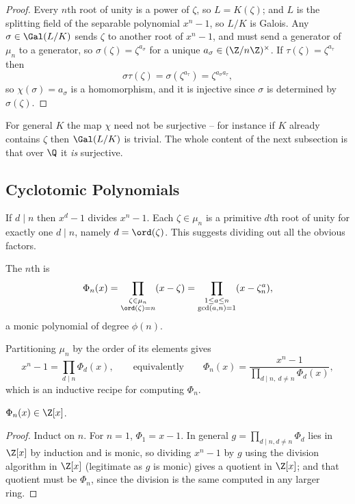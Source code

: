 \begin{proof}
	Every $n$th root of unity is a power of $\zeta$, so $L = K(\zeta)$; and $L$ is the splitting field of the separable polynomial $x^n-1$, so $L/K$ is Galois. Any $\sigma \in \Gal(L/K)$ sends $\zeta$ to another root of $x^n-1$, and must send a generator of $\mu_n$ to a generator, so $\sigma(\zeta) = \zeta^{a_\sigma}$ for a unique $a_\sigma \in (\Z/n\Z)^\times$. If $\tau(\zeta) = \zeta^{a_\tau}$ then
	$$\sigma\tau(\zeta) = \sigma(\zeta^{a_\tau}) = \zeta^{a_\sigma a_\tau},$$
	so $\chi(\sigma) = a_\sigma$ is a homomorphism, and it is injective since $\sigma$ is determined by $\sigma(\zeta)$.
\end{proof}

For general $K$ the map $\chi$ need not be surjective -- for instance if $K$ already contains $\zeta$ then $\Gal(L/K)$ is trivial. The whole content of the next subsection is that over $\Q$ it \emph{is} surjective.

\subsection{Cyclotomic Polynomials}

If $d \mid n$ then $x^d - 1$ divides $x^n-1$. Each $\zeta \in \mu_n$ is a primitive $d$th root of unity for exactly one $d \mid n$, namely $d = \ord(\zeta)$. This suggests dividing out all the obvious factors.

\begin{definition}
	The $n$th  is
	$$\Phi_n(x) = \prod_{\substack{\zeta \in \mu_n \\ \ord(\zeta) = n}} (x - \zeta) = \prod_{\substack{1 \leq a \leq n\\ \gcd(a,n)=1}}(x - \zeta_n^a),$$
	a monic polynomial of degree $\phi(n)$.
\end{definition}

Partitioning $\mu_n$ by the order of its elements gives
$$x^n - 1 = \prod_{d \mid n}\Phi_d(x), \qquad\text{equivalently}\qquad \Phi_n(x) = \frac{x^n-1}{\prod_{d\mid n,\ d\neq n}\Phi_d(x)},$$
which is an inductive recipe for computing $\Phi_n$.

\begin{proposition}
	$\Phi_n(x) \in \Z[x]$.
\end{proposition}

\begin{proof}
	Induct on $n$. For $n=1$, $\Phi_1 = x-1$. In general $g = \prod_{d\mid n, d\neq n}\Phi_d$ lies in $\Z[x]$ by induction and is monic, so dividing $x^n-1$ by $g$ using the division algorithm in $\Z[x]$ (legitimate as $g$ is monic) gives a quotient in $\Z[x]$; and that quotient must be $\Phi_n$, since the division is the same computed in any larger ring.
\end{proof}


